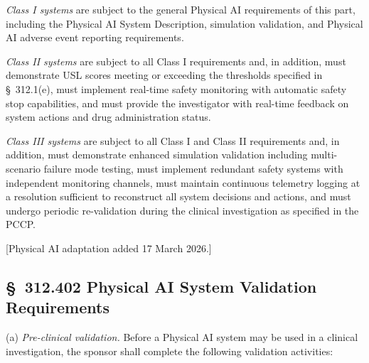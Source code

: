 \begin{description}[leftmargin=0.8cm,style=sameline]
\item[(1)] \textit{Class I systems} are subject to the general Physical AI requirements of this part, including the Physical AI System Description, simulation validation, and Physical AI adverse event reporting requirements.
\item[(2)] \textit{Class II systems} are subject to all Class I requirements and, in addition, must demonstrate USL scores meeting or exceeding the thresholds specified in \S~312.1(e), must implement real-time safety monitoring with automatic safety stop capabilities, and must provide the investigator with real-time feedback on system actions and drug administration status.
\item[(3)] \textit{Class III systems} are subject to all Class I and Class II requirements and, in addition, must demonstrate enhanced simulation validation including multi-scenario failure mode testing, must implement redundant safety systems with independent monitoring channels, must maintain continuous telemetry logging at a resolution sufficient to reconstruct all system decisions and actions, and must undergo periodic re-validation during the clinical investigation as specified in the PCCP.
\end{description}

[Physical AI adaptation added 17 March 2026.]

\subsection{\S~312.402 Physical AI System Validation Requirements}

(a) \textit{Pre-clinical validation.} Before a Physical AI system may be used in a clinical investigation, the sponsor shall complete the following validation activities:

